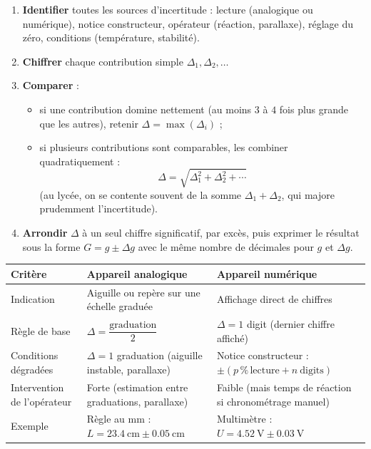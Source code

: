 \documentclass[11pt]{article}
\begin{document}
\begin{methode}
\begin{enumerate}
\item \textbf{Identifier} toutes les sources d'incertitude : lecture (analogique ou numérique), notice constructeur, opérateur (réaction, parallaxe), réglage du zéro, conditions (température, stabilité).
\item \textbf{Chiffrer} chaque contribution simple $\Delta_1, \Delta_2, \ldots$
\item \textbf{Comparer} :
\begin{itemize}
\item si une contribution domine nettement (au moins $3$ à $4$ fois plus grande que les autres), retenir $\Delta = \max(\Delta_i)$ ;
\item si plusieurs contributions sont comparables, les combiner quadratiquement :
\[
\Delta = \sqrt{\Delta_1^{2} + \Delta_2^{2} + \cdots}
\]
(au lycée, on se contente souvent de la somme $\Delta_1 + \Delta_2$, qui majore prudemment l'incertitude).
\end{itemize}
\item \textbf{Arrondir} $\Delta$ à un seul chiffre significatif, par excès, puis exprimer le résultat sous la forme $G = g \pm \Delta g$ avec le même nombre de décimales pour $g$ et $\Delta g$.
\end{enumerate}
\end{methode}

\begin{center}
\begin{tabularx}{\linewidth}{|l|X|X|}
\hline
\rowcolor{popblueL}
\textbf{Critère} & \textbf{Appareil analogique} & \textbf{Appareil numérique} \\
\hline
Indication & Aiguille ou repère sur une échelle graduée & Affichage direct de chiffres \\
\hline
Règle de base & $\Delta = \dfrac{\text{graduation}}{2}$ & $\Delta = 1$ digit (dernier chiffre affiché) \\
\hline
Conditions dégradées & $\Delta = 1$ graduation (aiguille instable, parallaxe) & Notice constructeur : $\pm(p\,\%\,\text{lecture} + n\ \text{digits})$ \\
\hline
Intervention de l'opérateur & Forte (estimation entre graduations, parallaxe) & Faible (mais temps de réaction si chronométrage manuel) \\
\hline
Exemple & Règle au mm : $L = \SI{23,4}{\centi\meter} \pm \SI{0,05}{\centi\meter}$ & Multimètre : $U = \SI{4,52}{\volt} \pm \SI{0,03}{\volt}$ \\
\hline
\end{tabularx}
\end{center}
\end{document}
